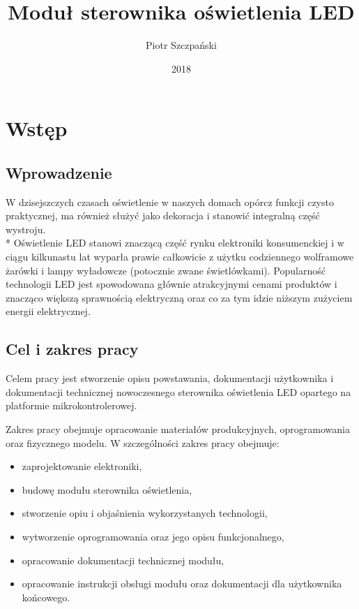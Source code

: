 \documentclass[12pt, eng, twoside, openany, final]{mgr}
\author{Piotr Szczpański}
\title{Moduł sterownika oświetlenia LED}
\date{2018}
\begin{document}
\maketitle
\tableofcontents
\listoffigures
\newpage

\pagestyle{fancy}
\fancyhead{} 
\fancyfoot{} 
\rfoot{\thepage}


\chapter{Wstęp}
\thispagestyle{fancy}
    \section{Wprowadzenie}
    W dzisejszczych czasach oświetlenie w naszych domach opórcz funkcji czysto praktycznej, ma również służyć jako dekoracja i stanowić integralną część wystroju. \\*
    Oświetlenie LED stanowi znaczącą część rynku elektroniki konsumenckiej i w ciągu kilkunastu lat wyparła prawie całkowicie z użytku codziennego wolframowe żarówki i lampy wyładowcze (potocznie zwane świetlówkami). Popularność technologii LED jest spowodowana głównie atrakcyjnymi cenami produktów i znacząco większą sprawnością elektryczną oraz co za tym idzie niższym zużyciem energii elektrycznej.
    
    \section{Cel i zakres pracy}
    Celem pracy jest stworzenie opisu powstawania, dokumentacji użytkownika i dokumentacji technicznej nowoczesnego sterownika oświetlenia LED opartego na platformie mikrokontrolerowej.
    
    Zakres pracy obejmuje opracowanie materiałów produkcyjnych, oprogramowania oraz fizycznego modelu. W szczególności zakres pracy obejmuje: 
    \begin{itemize}
        \item zaprojektowanie elektroniki, 
        \item budowę modułu sterownika oświetlenia,
        \item stworzenie opiu i objaśnienia wykorzystanych technologii,
        \item wytworzenie oprogramowania oraz jego opisu funkcjonalnego,
        \item opracowanie dokumentacji technicznej modułu,
        \item opracowanie instrukcji obsługi modułu oraz dokumentacji dla użytkownika końcowego.
    \end{itemize}
%
\end{document}
